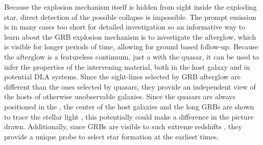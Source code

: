 Because the explosion mechanism itself is hidden from sight inside the exploding
star, direct detection of the possible collapse is impossible. The prompt
emission is in many cases too short for detailed investigation so an informative
way to learn about the GRB explosion mechanism is to investigate the afterglow,
which is visible for longer periods of time, allowing for ground based
follow-up. Because the afterglow is a featureless continuum, just a with the
quasar, it can be used to infer the properties of the intervening material, both
in the host galaxy and in potential DLA systems. Since the sight-lines selected
by GRB afterglow are different than the ones selected by quasars, they provide
an independent view of the hosts of otherwise unobservable galaxies. Since the
quasars are always positioned in the , the center of the host galaxies and the
long GRBs are shown to trace the stellar light \citep{Fruchter2006,
Anderson2015}, this potentially could make a difference in the picture drawn.
Additionally, since GRBs are visible to such extreme redshifts
\citep{Salvaterra2009}, they provide a unique probe to select star formation at
the earliest times. 

